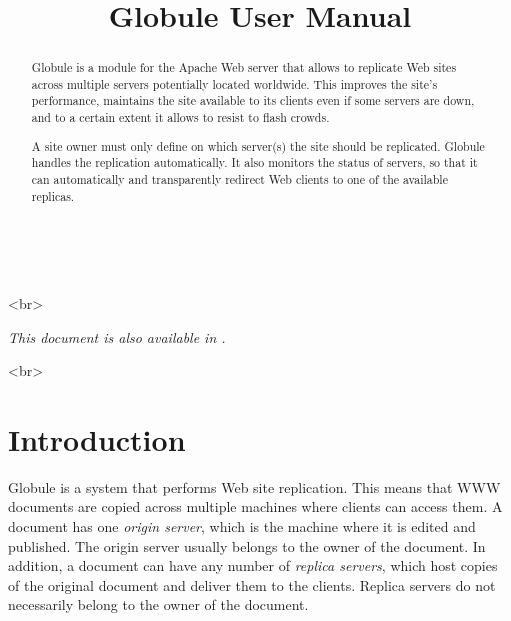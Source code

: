\documentclass[10pt,a4paper]{article}
\title{Globule User Manual}
\date{Version \globuleversion
  \ifhevea \begin{rawhtml}</H3> 
<H3 ALIGN=center>\end{rawhtml} \else \\ \fi
  \ahrefurl{http://www.globule.org/}}
\author{\ahref{\url{http://www.halderen.net/}}{Berry~van~Halderen} \and
  \ahref{\url{http://www.cs.vu.nl/~gpierre/}}{Guillaume~Pierre}}
\makeatletter
\newcommand{\vfill}{}
\newenvironment{p}{\@open{P}{}}{\@close{P}}
\newenvironment{p}{}{\par}
\newcommand\sectionbr{}
\makeatother
\begin{document}
\maketitle

\vfill ~\\
\begin{abstract}\normalsize
Globule is a module for the Apache Web server that allows to replicate Web
sites across multiple servers potentially located worldwide. This improves the
site's performance, maintains the site available to its clients even if some
servers are down, and to a certain extent it allows to resist to flash crowds.

A site owner must only define on which server(s) the site should be
replicated. Globule handles the replication automatically. It also monitors
the status of servers, so that it can automatically and transparently redirect
Web clients to one of the available replicas.
\end{abstract}
\vfill

\newpage

\ifhevea
\begin{rawhtml}<br>\end{rawhtml}
\begin{center}
  \emph{This document is also available in .}
\end{center}
\begin{rawhtml}<br>\end{rawhtml}
\fi

\tableofcontents


\newpage
\section{\sectionbr\label{sec:intro}Introduction\sectionbr}

\begin{p}
Globule is a system that performs Web site replication. This means that WWW
documents are copied across multiple machines where clients can access them.
A document has one \emph{origin server}, which is the machine where it is
edited and published. The origin server usually belongs to the owner of the
document. In addition, a document can have any number of \emph{replica
servers}, which host copies of the original document and deliver them to the
clients.  Replica servers do not necessarily belong to the owner of the
document.
\end{p}
\end{document}
